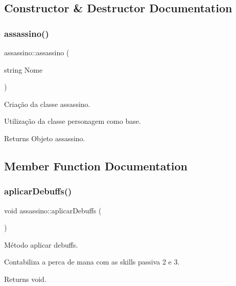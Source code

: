 \subsection{Constructor \& Destructor Documentation}
\mbox{\label{classassassino_a107c275bfe816f79279ec3976223974f}} 
\subsubsection{\texorpdfstring{assassino()}{assassino()}}
{\footnotesize\ttfamily assassino\+::assassino (\begin{DoxyParamCaption}\item[{string}]{Nome }\end{DoxyParamCaption})}



Criação da classe assassino. 

Utilização da classe personagem como base. \begin{DoxyReturn}{Returns}
Objeto assassino. 
\end{DoxyReturn}


\subsection{Member Function Documentation}
\mbox{\label{classassassino_a283e61020246d2bec61fe8e661a412e9}} 
\subsubsection{\texorpdfstring{aplicar\+Debuffs()}{aplicarDebuffs()}}
{\footnotesize\ttfamily void assassino\+::aplicar\+Debuffs (\begin{DoxyParamCaption}{ }\end{DoxyParamCaption})}



Método aplicar debuffs. 

Contabiliza a perca de mana com as skills passiva 2 e 3. \begin{DoxyReturn}{Returns}
void. 
\end{DoxyReturn}
\mbox{\label{classassassino_a3f46fb60f6617502542fe7377a6499ab}} 
